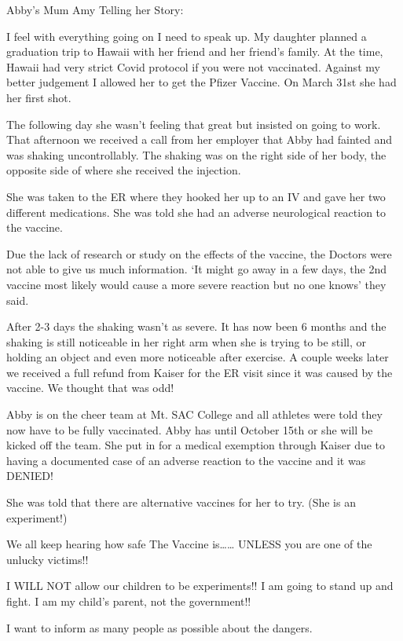 Abby’s Mum Amy Telling her Story:

I feel with everything going on I need to speak up. My daughter planned a
graduation trip to Hawaii with her friend and her friend’s family. At the time,
Hawaii had very strict Covid protocol if you were not vaccinated. Against my
better judgement I allowed her to get the Pfizer Vaccine. On March 31st she had
her first shot.

The following day she wasn’t feeling that great but insisted on going to
work. That afternoon we received a call from her employer that Abby had fainted
and was shaking uncontrollably. The shaking was on the right side of her body,
the opposite side of where she received the injection.

She was taken to the ER where they hooked her up to an IV and gave her two
different medications. She was told she had an adverse neurological reaction to
the vaccine.

Due the lack of research or study on the effects of the vaccine, the Doctors were not able to give us much information. ‘It might go away in a few days, the 2nd vaccine most likely would cause a more severe reaction but no one knows’ they said.

After 2-3 days the shaking wasn’t as severe. It has now been 6 months and the
shaking is still noticeable in her right arm when she is trying to be still, or
holding an object and even more noticeable after exercise. A couple weeks later
we received a full refund from Kaiser for the ER visit since it was caused by
the vaccine. We thought that was odd!

Abby is on the cheer team at Mt. SAC College and all athletes were told they now
have to be fully vaccinated. Abby has until October 15th or she will be kicked
off the team. She put in for a medical exemption through Kaiser due to having a
documented case of an adverse reaction to the vaccine and it was DENIED!

She was told that there are alternative vaccines for her to try. (She is an
experiment!)

We all keep hearing how safe The Vaccine is…… UNLESS you are one of the unlucky
victims!!

I WILL NOT allow our children to be experiments!! I am going to stand up and
fight. I am my child’s parent, not the government!!

I want to inform as many people as possible about the dangers.

